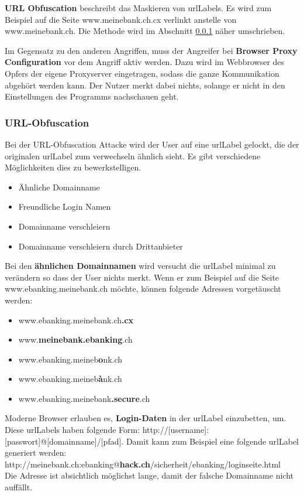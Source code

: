 \textbf{URL Obfuscation} beschreibt das Maskieren von \Glspl{urlLabel}. Es wird zum Beispiel auf die Seite www.meinebank.ch.cx verlinkt anstelle von www.meinebank.ch. Die Methode wird im Abschnitt \ref{sec:phishing:angriffvorbereiten:attacken:urlobfuscationattacke} näher umschrieben.

Im Gegensatz zu den anderen Angriffen, muss der Angreifer bei \textbf{Browser Proxy Configuration} vor dem Angriff aktiv werden. Dazu wird im Webbrowser des Opfers der eigene Proxyserver eingetragen, sodass die ganze Kommunikation abgehört werden kann. Der Nutzer merkt dabei nichts, solange er nicht in den Einstellungen des Programms nachschauen geht.

\subsubsection{URL-Obfuscation}
\label{sec:phishing:angriffvorbereiten:attacken:urlobfuscationattacke}
Bei der URL-Obfuscation Attacke wird der User auf eine \Gls{urlLabel} gelockt, die der originalen \Gls{urlLabel} zum verwechseln ähnlich sieht. Es gibt verschiedene Möglichkeiten dies zu bewerkstelligen.
\begin{itemize}
\item Ähnliche Domainname 
\item Freundliche Login Namen
\item Domainname verschleiern
\item Domainname verschleiern durch Drittanbieter
\end{itemize}

Bei den \textbf{ähnlichen Domainnamen} wird versucht die \Gls{urlLabel} minimal zu verändern so dass der User nichts merkt. Wenn er zum Beispiel auf die Seite www.ebanking.meinebank.ch möchte, können folgende Adressen vorgetäuscht werden:
\begin{itemize}
\item www.ebanking.meinebank.ch\textbf{.cx}
\item www.\textbf{meinebank.ebanking}.ch
\item www.ebanking.meineb\textbf{o}nk.ch
\item www.ebanking.meineb\textbf{{à}}nk.ch
\item www.ebanking.meinebank\textbf{.secure}.ch
\end{itemize}

Moderne Browser erlauben es, \textbf{Login-Daten} in der \Gls{urlLabel} einzubetten, um. Diese \Glspl{urlLabel} haben folgende Form: http://[username]:[passwort]@[domainname]/[pfad]. Damit kann zum Beispiel eine folgende \Gls{urlLabel} generiert werden:\\
http://meinebank.ch:ebanking@\textbf{hack.ch}/sicherheit/ebanking/loginseite.html\\
Die Adresse ist absichtlich möglichst lange, damit der falsche Domainname nicht auffällt.

